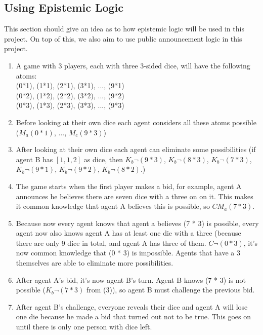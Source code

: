 \documentclass{article}
\begin{document}
\subsection{Using Epistemic Logic}

This section should give an idea as to how epistemic logic will be used in this project. On top of this, we also aim to use public announcement logic in this project.
\begin{enumerate}
    \item A game with 3 players, each with three 3-sided dice, will have the following atoms:\\
    (0*1), (1*1), (2*1), (3*1), ..., (9*1)\\
    (0*2), (1*2), (2*2), (3*2), ..., (9*2)\\
    (0*3), (1*3), (2*3), (3*3), ..., (9*3)\\
    \item Before looking at their own dice each agent considers all these atoms possible ($M_a(0*1)$, ..., $M_c(9*3)$)
    \item After looking at their own dice each agent can eliminate some possibilities (if agent B has $[1, 1, 2]$ as dice, then $K_b \neg (9 * 3)$, $K_b \neg (8 * 3)$, $K_b \neg (7 * 3)$, $K_b \neg (9 * 1)$, $K_b \neg (9 * 2)$, $K_b \neg (8 * 2)$.)
    \item The game starts when the first player makes a bid, for example, agent A announces he believes there are seven dice with a three on on it. This makes it common knowledge that agent A believes this is possible, so $CM_a(7 * 3)$.
    \item Because now every agent knows that agent a believes (7 * 3) is possible, every agent now also knows agent A has at least one die with a three (because there are only 9 dice in total, and agent A has three of them. $C \neg (0 * 3)$, it's now common knowledge that (0 * 3) is impossible. Agents that have a 3 themselves are able to eliminate more possibilities.
    \item After agent A's bid, it's now agent B's turn. Agent B knows (7 * 3) is not possible ($K_b \neg (7 * 3)$ from (3)), so agent B must challenge the previous bid.
    \item After agent B's challenge, everyone reveals their dice and agent A will lose one die because he made a bid that turned out not to be true. This goes on until there is only one person with dice left.
\end{enumerate}




%
\end{document}
